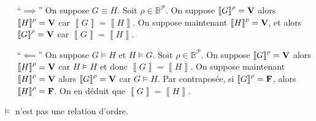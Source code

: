 \begin{prv}
	\begin{itemize}
		\item[``$\implies$\/''] On suppose $G \equiv H$. Soit $\rho \in \mathds{B}^{\mathcal{P}}$. On suppose $\left\llbracket G \right\rrbracket^\rho = {\mathbf{V}}\/ $\/ alors $\left\llbracket H \right\rrbracket^{\rho} = {\mathbf{V}}\/$\/ car $\left\llbracket G \right\rrbracket = \left\llbracket H \right\rrbracket$.
			On suppose maintenant $\left\llbracket H \right\rrbracket^{\rho} = {\mathbf{V}}\/$, et alors $\left\llbracket G \right\rrbracket^\rho = {\mathbf{V}}\/$\/ car $\left\llbracket G \right\rrbracket = \left\llbracket H \right\rrbracket$.
		\item[``$\impliedby$\/'']  On suppose $G \models H$\/ et $H \models G$. Soit $\rho \in \mathds{B}^{\mathcal{P}}$. On suppose $\left\llbracket G \right\rrbracket^{\rho} = {\mathbf{V}}\/$\/ alors $\left\llbracket H \right\rrbracket^\rho = {\mathbf{V}}\/$\/ car $H \models H$\/ et donc $\left\llbracket G \right\rrbracket = \left\llbracket H \right\rrbracket$. On suppose maintenant $\left\llbracket H \right\rrbracket^\rho = {\mathbf{V}}\/$\/ alors $\left\llbracket G \right\rrbracket^\rho = {\mathbf{V}}\/$\/ car $G \models H$. Par contraposée, si $\left\llbracket G \right\rrbracket^\rho = {\mathbf{F}}\/$, alors $\left\llbracket H \right\rrbracket^\rho = {\mathbf{F}}\/$. On en déduit que $\left\llbracket G \right\rrbracket = \left\llbracket H \right\rrbracket$.
	\end{itemize}
\end{prv}

\begin{rmk}
	$\models$\/ n'est pas une relation d'ordre.
\end{rmk}


